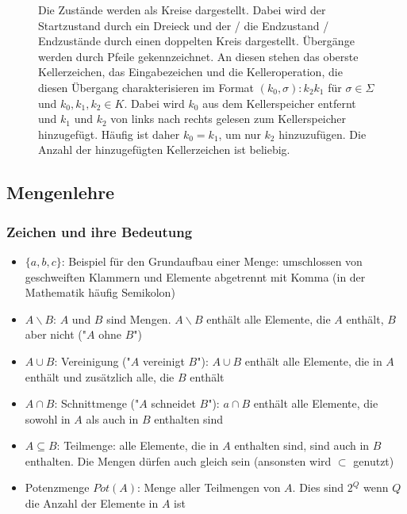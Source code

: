 \documentclass{article}
\begin{document}
	\begin{figure}[!h]
		\centering
		
		\caption{Die Zustände werden als Kreise dargestellt. Dabei wird der Startzustand durch ein Dreieck und der / die Endzustand / Endzustände durch einen doppelten Kreis dargestellt. Übergänge werden durch Pfeile gekennzeichnet. An diesen stehen das oberste Kellerzeichen, das Eingabezeichen und die Kelleroperation, die diesen Übergang charakterisieren im Format $(k_0, \sigma): k_2 k_1$ für $\sigma \in \Sigma$ und $k_0, k_1, k_2 \in K$. Dabei wird $k_0$ aus dem Kellerspeicher entfernt und $k_1$ und $k_2$ von links nach rechts gelesen zum Kellerspeicher hinzugefügt. Häufig ist daher $k_0 = k_1$, um nur $k_2$ hinzuzufügen. Die Anzahl der hinzugefügten Kellerzeichen ist beliebig.}
	\end{figure}	
	
	\subsection{Mengenlehre}
	
	\subsubsection{Zeichen und ihre Bedeutung}
	
	\begin{itemize}
		\item $\{a, b, c\}$: Beispiel für den Grundaufbau einer Menge: umschlossen von geschweiften Klammern und Elemente abgetrennt mit Komma (in der Mathematik häufig Semikolon)
		\item $A \backslash B$: $A$ und $B$ sind Mengen. $A \backslash B$ enthält alle Elemente, die $A$ enthält, $B$ aber nicht ("$A$ ohne $B$")
		\item $A \cup B$: Vereinigung ("$A$ vereinigt $B$"): $A \cup B$ enthält alle Elemente, die in $A$ enthält und zusätzlich alle, die $B$ enthält
		\item $A \cap B$: Schnittmenge ("$A$ schneidet $B$"): $a \cap B$ enthält alle Elemente, die sowohl in $A$ als auch in $B$ enthalten sind
		\item $A \subseteq B$: Teilmenge: alle Elemente, die in $A$ enthalten sind, sind auch in $B$ enthalten. Die Mengen dürfen auch gleich sein (ansonsten wird $\subset$ genutzt)
		\item Potenzmenge $Pot(A)$: Menge aller Teilmengen von $A$. Dies sind $2^Q$ wenn $Q$ die Anzahl der Elemente in $A$ ist
	\end{itemize}
\end{document}
